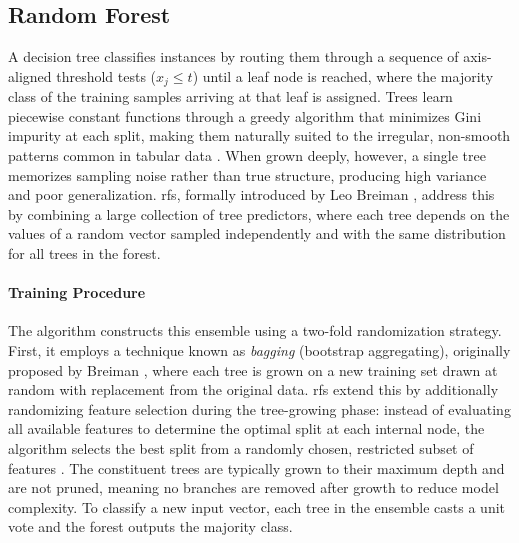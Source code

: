 \subsection{Random Forest}
\label{sec:theoretical_rf}

A decision tree classifies instances by routing them through a sequence of axis-aligned threshold tests ($x_j \leq t$) until a leaf node is reached, where the majority class of the training samples arriving at that leaf is assigned. Trees learn piecewise constant functions through a greedy algorithm that minimizes Gini impurity at each split, making them naturally suited to the irregular, non-smooth patterns common in tabular data \parencite{friedmanGreedyFunctionApproximation2001}. When grown deeply, however, a single tree memorizes sampling noise rather than true structure, producing high variance and poor generalization. \glspl{rf}, formally introduced by Leo Breiman \parencite{breimanRandomForests2001}, address this by combining a large collection of tree predictors, where each tree depends on the values of a random vector sampled independently and with the same distribution for all trees in the forest.

\paragraph{Training Procedure}
The algorithm constructs this ensemble using a two-fold randomization strategy. First, it employs a technique known as \textit{bagging} (bootstrap aggregating), originally proposed by Breiman \parencite{breimanBaggingPredictors1996}, where each tree is grown on a new training set drawn at random with replacement from the original data. \glspl{rf} extend this by additionally randomizing feature selection during the tree-growing phase: instead of evaluating all available features to determine the optimal split at each internal node, the algorithm selects the best split from a randomly chosen, restricted subset of features \parencite{breimanRandomForests2001}. The constituent trees are typically grown to their maximum depth and are not pruned, meaning no branches are removed after growth to reduce model complexity. To classify a new input vector, each tree in the ensemble casts a unit vote and the forest outputs the majority class.

